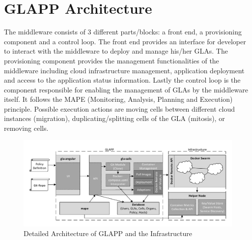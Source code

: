 \documentclass{seal_thesis}
\begin{document}
\section{GLAPP Architecture}
The middleware consists of 3 different parts/blocks: a front end, a provisioning component and a control loop.
The front end provides an interface for developer to interact with the middleware to deploy and manage his/her GLAs.
The provisioning component provides the management functionalities of the middleware including cloud infrastructure management, application deployment and access to the application status information.
Lastly the control loop is the component responsible for enabling the management of GLAs by the middleware itself.
It follows the MAPE (Monitoring, Analysis, Planning and Execution) principle.
Possible execution actions are moving cells between different cloud instances (migration), duplicating/splitting cells of the GLA (mitosis), or removing cells.

\begin{figure}[!ht]
\centering
	\includegraphics[width=\textwidth]{detailed_architecture.pdf}
	\caption{Detailed Architecture of GLAPP and the Infrastructure}
	\label{fig:detailed}
\end{figure}

\noindent{}
\end{document}
